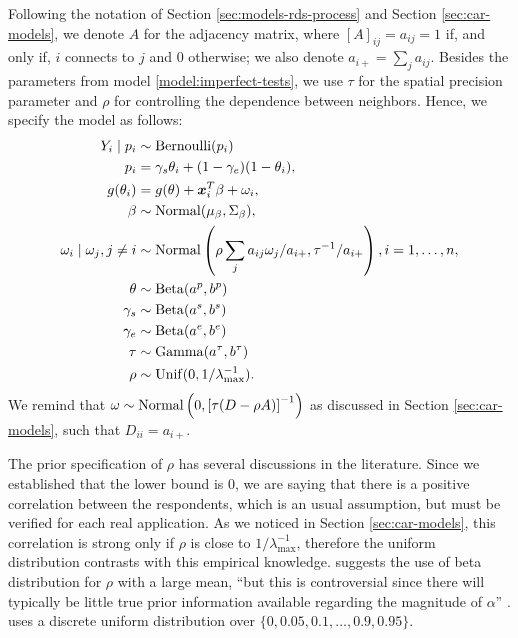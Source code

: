 Following the notation of Section \ref{sec:models-rds-process} and Section
\ref{sec:car-models}, we denote $A$ for the adjacency matrix, where $[A]_{ij}
=a_{ij} = 1$ if, and only if, $i$ connects to $j$ and $0$ otherwise; we also
denote $a_{i+} = \sum_j a_{ij}$. Besides the
parameters from model \ref{model:imperfect-tests}, we use $\tau$
for the spatial precision parameter and $\rho$ for controlling the dependence between neighbors. Hence, we specify
the model as follows:
\begin{equation}
  \label{model:imperfect-tests-rds}
  \begin{aligned}
    Y_i \mid p_i &\sim \operatorname{Bernoulli}(p_i) \\
    p_i &= \gamma_s\theta_i + (1-\gamma_e)(1 - \theta_i),  \\
    g(\theta_i) &= g(\theta) + \boldsymbol{x}_i^T\beta + \omega_i,  \\
    \beta  &\sim \operatorname{Normal}(\mu_{\beta}, \Sigma_{\beta}), \\ 
    \omega_i \mid \omega_j, j \neq i &\sim \operatorname{Normal}\left(\rho\sum_j a_{ij} \omega_j / a_{i+}, \tau^{-1} / a_{i+}\right), i = 1, \dots, n, \\
    \theta &\sim \operatorname{Beta}(a^p, b^p) \\ 
    \gamma_s &\sim \operatorname{Beta}(a^s, b^s) \\
    \gamma_e &\sim \operatorname{Beta}(a^e, b^e) \\
    \tau &\sim \operatorname{Gamma}(a^{\tau}, b^{\tau}) \\
    \rho & \sim \operatorname{Unif}(0,1/\lambda_{\max}^{-1}).
  \end{aligned}  
\end{equation}
We remind that $\omega \sim \operatorname{Normal}\left(0, \left[\tau (D - \rho
A)\right]^{-1}\right)$ as discussed in Section \ref{sec:car-models}, such that
$D_{ii} = a_{i+}$. 

The prior specification of $\rho$ has several discussions in the literature.
Since we established that the lower bound is 0, we are saying that there is a
positive correlation between the respondents, which is an usual assumption,
but must be verified for each real application. As we noticed in Section
\ref{sec:car-models}, this correlation is strong only if $\rho$ is close to
$1/\lambda_{\max}^{-1}$, therefore the uniform distribution contrasts with
this empirical knowledge. \textcite[p. 177]{banerjee2003hierarchical} suggests
the use of beta distribution for $\rho$ with a large mean, ``but this is
controversial since there will typically be little true prior information
available regarding the magnitude of $\alpha$'' \cite[$\alpha$ is the
parameter $\rho$ in our notation.][p.
177]{banerjee2003hierarchical}. \textcite[p. 81]{lee2011comparison} uses a
discrete uniform distribution over $\{0, 0.05, 0.1, \dots, 0.9, 0.95\}$. 

